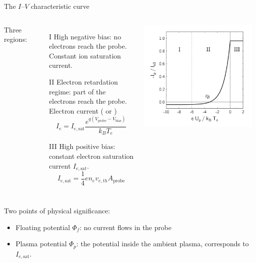 \documentclass[10pt]{beamer}
\newcommand{\electronsaturationcurrent}[0]{\ensuremath{I_{e,{\mathrm{sat}}}}}
\newcommand{\biasvoltage}{\ensuremath{V_{\mathrm{bias}}}}
\newcommand{\probevoltage}{\ensuremath{V_{\mathrm{probe}}}}
\begin{document}
\begin{frame}{The $I$--$V$ characteristic curve}
    \begin{columns}
        Three regions:
        \begin{enumerate}
            \item[I] High negative bias: no electrons reach the probe. Constant ion saturation current.
            \item[II] Electron retardation regime: part of the electrons reach the probe. Electron current ( or )
            \begin{equation*}
                I_e = \electronsaturationcurrent \frac{e^{q(\probevoltage - \biasvoltage)}}{k_B T_e}
            \end{equation*}
            \item[III] High positive bias: constant electron saturation current $\electronsaturationcurrent$.
            \begin{equation*}
                \electronsaturationcurrent = \frac{1}{4}e n_e v_{e,th} A_{\mathrm{probe}}
            \end{equation*}
        \end{enumerate}
        \includegraphics[width=\textwidth]{../figures/langmuir_characteristic_PLACEHOLDER.png}
    \end{columns}
    Two points of physical significance:
    \begin{itemize}
        \item Floating potential $\Phi_f$: no current flows in the probe
        \item Plasma potential $\Phi_p$: the potential inside the ambient plasma, corresponds to $\electronsaturationcurrent$.
            
    \end{itemize}
\end{frame}
\end{document}
